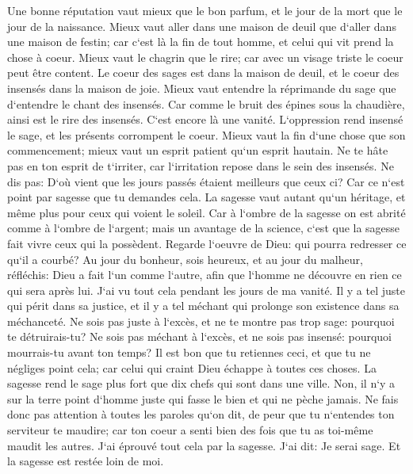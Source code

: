 \verse Une bonne réputation vaut mieux que le bon parfum, et le jour de la mort que le jour de la naissance. 
\verse Mieux vaut aller dans une maison de deuil que d`aller dans une maison de festin; car c`est là la fin de tout homme, et celui qui vit prend la chose à coeur. 
\verse Mieux vaut le chagrin que le rire; car avec un visage triste le coeur peut être content. 
\verse Le coeur des sages est dans la maison de deuil, et le coeur des insensés dans la maison de joie. 
\verse Mieux vaut entendre la réprimande du sage que d`entendre le chant des insensés. 
\verse Car comme le bruit des épines sous la chaudière, ainsi est le rire des insensés. C`est encore là une vanité. 
\verse L`oppression rend insensé le sage, et les présents corrompent le coeur. 
\verse Mieux vaut la fin d`une chose que son commencement; mieux vaut un esprit patient qu`un esprit hautain. 
\verse Ne te hâte pas en ton esprit de t`irriter, car l`irritation repose dans le sein des insensés. 
\verse Ne dis pas: D`où vient que les jours passés étaient meilleurs que ceux ci? Car ce n`est point par sagesse que tu demandes cela. 
\verse La sagesse vaut autant qu`un héritage, et même plus pour ceux qui voient le soleil. 
\verse Car à l`ombre de la sagesse on est abrité comme à l`ombre de l`argent; mais un avantage de la science, c`est que la sagesse fait vivre ceux qui la possèdent. 
\verse Regarde l`oeuvre de Dieu: qui pourra redresser ce qu`il a courbé? 
\verse Au jour du bonheur, sois heureux, et au jour du malheur, réfléchis: Dieu a fait l`un comme l`autre, afin que l`homme ne découvre en rien ce qui sera après lui. 
\verse J`ai vu tout cela pendant les jours de ma vanité. Il y a tel juste qui périt dans sa justice, et il y a tel méchant qui prolonge son existence dans sa méchanceté. 
\verse Ne sois pas juste à l`excès, et ne te montre pas trop sage: pourquoi te détruirais-tu? 
\verse Ne sois pas méchant à l`excès, et ne sois pas insensé: pourquoi mourrais-tu avant ton temps? 
\verse Il est bon que tu retiennes ceci, et que tu ne négliges point cela; car celui qui craint Dieu échappe à toutes ces choses. 
\verse La sagesse rend le sage plus fort que dix chefs qui sont dans une ville. 
\verse Non, il n`y a sur la terre point d`homme juste qui fasse le bien et qui ne pèche jamais. 
\verse Ne fais donc pas attention à toutes les paroles qu`on dit, de peur que tu n`entendes ton serviteur te maudire; 
\verse car ton coeur a senti bien des fois que tu as toi-même maudit les autres. 
\verse J`ai éprouvé tout cela par la sagesse. J`ai dit: Je serai sage. Et la sagesse est restée loin de moi. 

